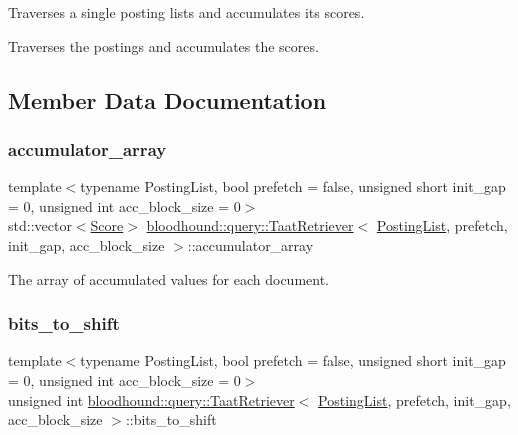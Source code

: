 Traverses a single posting lists and accumulates its scores. 

Traverses the postings and accumulates the scores. 

\subsection{Member Data Documentation}
\mbox{\label{classbloodhound_1_1query_1_1TaatRetriever_a604c7ab279ced03ccc1866d55c844b11}} 
\subsubsection{\texorpdfstring{accumulator\+\_\+array}{accumulator\_array}}
{\footnotesize\ttfamily template$<$typename Posting\+List, bool prefetch = false, unsigned short init\+\_\+gap = 0, unsigned int acc\+\_\+block\+\_\+size = 0$>$ \\
std\+::vector$<$\hyperlink{structbloodhound_1_1Score}{Score}$>$ \hyperlink{classbloodhound_1_1query_1_1TaatRetriever}{bloodhound\+::query\+::\+Taat\+Retriever}$<$ \hyperlink{classbloodhound_1_1PostingList}{Posting\+List}, prefetch, init\+\_\+gap, acc\+\_\+block\+\_\+size $>$\+::accumulator\+\_\+array\hspace{0.3cm}{\ttfamily [protected]}}



The array of accumulated values for each document. 

\mbox{\label{classbloodhound_1_1query_1_1TaatRetriever_aa2b4875de4f02a856e64560bf002296f}} 
\subsubsection{\texorpdfstring{bits\+\_\+to\+\_\+shift}{bits\_to\_shift}}
{\footnotesize\ttfamily template$<$typename Posting\+List, bool prefetch = false, unsigned short init\+\_\+gap = 0, unsigned int acc\+\_\+block\+\_\+size = 0$>$ \\
unsigned int \hyperlink{classbloodhound_1_1query_1_1TaatRetriever}{bloodhound\+::query\+::\+Taat\+Retriever}$<$ \hyperlink{classbloodhound_1_1PostingList}{Posting\+List}, prefetch, init\+\_\+gap, acc\+\_\+block\+\_\+size $>$\+::bits\+\_\+to\+\_\+shift\hspace{0.3cm}{\ttfamily [protected]}}

